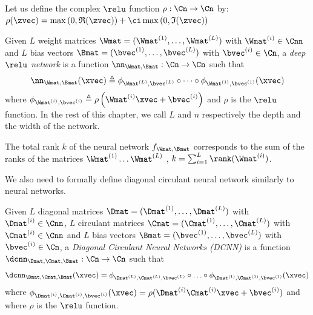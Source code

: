 \begin{definition}
  Let us define the complex $\relu$ function $\rho: \Cn \rightarrow \Cn$ by: $\rho(\zvec) = \max\left(0, \mathfrak{R}(\zvec)\right) + \ci \max\left(0, \mathfrak{I}(\zvec) \right)$
  \label{definition:relu_function}
\end{definition}


\begin{definition} \label{definition:deep_relu_network}
  Given $L$ weight matrices $\Wmat = (\Wmat^{(1)}, \ldots, \Wmat^{(L)})$ with $\Wmat^{(i)} \in \Cnn$ and  $L$ bias vectors $\Bmat = (\bvec^{(1)}, \ldots, \bvec^{(L)})$  with  $\bvec^{(i)} \in \Cn$, a \emph{deep $\relu$ network} is a function $\nn_{\Wmat, \Bmat} : \Cn \rightarrow \Cn$ such that
  \begin{equation}
    \nn_{\Wmat,\Bmat}(\xvec) \triangleq \phi_{\Wmat^{(L)}, \bvec^{(L)}} \circ \cdots \circ \phi_{\Wmat^{(1)}, \bvec^{(1)}}(\xvec)
  \end{equation}
  where $\phi_{\Wmat^{(i)},\bvec^{(i)}} \triangleq \rho\left(\Wmat^{(i)}\xvec + \bvec^{(i)}\right)$ and $\rho$ is the $\relu$ function.
  In the rest of this chapter, we call $L$ and $n$ respectively the depth and the width of the network.
\end{definition}

\begin{definition}
  The total rank $k$ of the neural network $f_{\Wmat, \Bmat}$ corresponds to the sum of the ranks of the matrices $\Wmat^{(1)} \ldots \Wmat^{(L)}$ \ie, $k = \sum_{i=1}^L \rank(\Wmat^{(i)})$.
\end{definition}

\noindent
We also need to formally define diagonal circulant neural network similarly to neural networks.

\begin{definition} \label{definition:DCNN}
  Given $L$ diagonal matrices $\Dmat = (\Dmat^{(1)}, \ldots, \Dmat^{(L)})$ with $\Dmat^{(i)} \in \Cnn$, $L$ circulant matrices $\Cmat = (\Cmat^{(1)}, \ldots, \Cmat^{(L)})$ with $\Cmat^{(i)} \in \Cnn$ and $L$ bias vectors $\Bmat = (\bvec^{(1)}, \ldots, \bvec^{(L)})$ with  $\bvec^{(i)} \in \Cn$, a \emph{Diagonal Circulant Neural Networks (DCNN)} is a function $\dcnn_{\Dmat, \Cmat, \Bmat} : \Cn \rightarrow \Cn$ such that 
  \begin{equation}
    \dcnn_{\Dmat,\Cmat,\Bmat}(\xvec) = \phi_{\Dmat^{(L)}, \Cmat^{(L)}, \bvec^{(L)}} \circ \ldots \circ \phi_{\Dmat^{(1)}, \Cmat^{(1)}, \bvec^{(1)}} (\xvec)
  \end{equation}
   where $\phi_{\Dmat^{(i)}, \Cmat^{(i)}, \bvec^{(i)}}(\xvec) = \rho (\Dmat^{(i)} \Cmat^{(i)} \xvec + \bvec^{(i)})$ and where $\rho$ is the $\relu$ function.
\end{definition}



